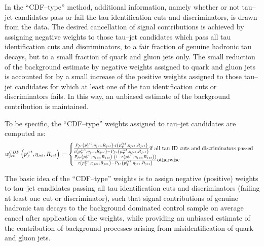 In the ``CDF--type'' method, additional information, namely whether or not
tau--jet candidates pass or fail the tau identification cuts and discriminators,
is drawn from the data.  The desired cancellation of signal contributions is
achieved by assigning negative weights to those tau--jet candidates which pass
all tau identification cuts and discriminators, \ie to a fair fraction of
genuine hadronic tau decays, but to a small fraction of quark and gluon jets
only.  The small reduction of the background estimate by negative weights
assigned to quark and gluon jets is accounted for by a small increase of the
positive weights assigned to those tau--jet candidates for which at least one of
the tau identification cuts or discriminators fails.  In this way, an unbiased
estimate of the background contribution is maintained.

To be specific, the ``CDF--type'' weights assigned to tau--jet candidates are computed as:
\begin{equation}
w_{jet}^{CDF} \left( p_{\mathrm{T}}^{jet}, \eta_{jet}, R_{jet} \right) 
:= 
\begin{cases} 
   \frac{P_{fr} \left( p_{\mathrm{T}}^{jet}, \eta_{jet}, R_{jet} \right) \cdot 
         \varepsilon \left( p_{\mathrm{T}}^{jet}, \eta_{jet}, R_{jet} \right)}
        {\varepsilon \left( p_{\mathrm{T}}^{jet}, \eta_{jet}, R_{jet} \right) - P_{fr} \left( p_{\mathrm{T}}^{jet}, \eta_{jet}, R_{jet} \right)}
      \mbox{if all tau ID cuts and discriminators passed} \\
   \frac{P_{fr} \left( p_{\mathrm{T}}^{jet}, \eta_{jet}, R_{jet} \right) \cdot 
         \left( 1 - \varepsilon \left( p_{\mathrm{T}}^{jet}, \eta_{jet}, R_{jet} \right) \right)}
        {\varepsilon \left( p_{\mathrm{T}}^{jet}, \eta_{jet}, R_{jet} \right) - P_{fr} \left( p_{\mathrm{T}}^{jet}, \eta_{jet}, R_{jet} \right)}
      \mbox{otherwise}
\end{cases}
\label{eqBgEstFakeRate_frCDFtypeJetWeight}
\end{equation}

The basic idea of the ``CDF--type'' weights is to assign negative (positive)
weights to tau--jet candidates passing all tau identification cuts and
discriminators (failing at least one cut or discriminator), such that signal
contributions of genuine hadronic tau decays to the background dominated control
sample on average cancel after application of the weights, while providing an
unbiased estimate of the contribution of background processes arising from
misidentification of quark and gluon jets.

